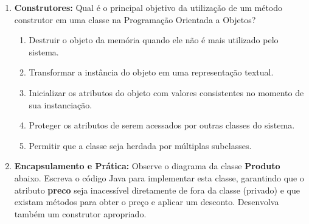 \documentclass[12pt,a4paper]{article}
\newcommand{\resposta}[1]{
\noindent
\framebox[\textwidth]{
\begin{minipage}{0.98\textwidth}
\vspace{#1}
\end{minipage}
}
}
\begin{document}
\begin{enumerate}
    \item \textbf{Construtores:} Qual é o principal objetivo da utilização de um método construtor em uma classe na Programação Orientada a Objetos?
    \begin{enumerate}[label=\Alph*)]
        \item Destruir o objeto da memória quando ele não é mais utilizado pelo sistema.
        \item Transformar a instância do objeto em uma representação textual.
        \item Inicializar os atributos do objeto com valores consistentes no momento de sua instanciação.
        \item Proteger os atributos de serem acessados por outras classes do sistema.
        \item Permitir que a classe seja herdada por múltiplas subclasses.
    \end{enumerate}

    \vspace{0.3cm}

    \item \textbf{Encapsulamento e Prática:} Observe o diagrama da classe \textbf{Produto} abaixo. Escreva o código Java para implementar esta classe, garantindo que o atributo \textbf{preco} seja inacessível diretamente de fora da classe (privado) e que existam métodos para obter o preço e aplicar um desconto. Desenvolva também um construtor apropriado.

    \begin{center} 
    \end{center}

    \resposta{15cm}


\end{enumerate}
\end{document}
